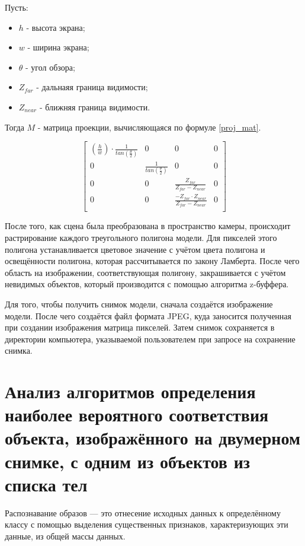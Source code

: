 Пусть:
\begin{itemize}
\item $h$ - высота экрана;
\item $w$ - ширина экрана;
\item $\theta$ - угол обзора;
\item $Z_{far}$ - дальнаяя граница видимости;
\item $Z_{near}$ - ближняя граница видимости.
\end{itemize}

Тогда $M$ - матрица проекции, вычисляющаяся по формуле \ref{proj_mat}.

\begin{equation}\label{proj_mat}
\begin{bmatrix}
(\frac{h}{w})\cdot \frac{1}{tan(\frac{\theta}{2})} & 0 & 0 & 0\\
0 & \frac{1}{tan(\frac{\theta}{2})} & 0 & 0\\
0 & 0 & \frac{Z_{far}}{Z_{far} - Z_{near}} & 0\\
0 & 0 & \frac{-Z_{far} \cdot Z_{near}}{Z_{far} - Z_{near}} & 0\\
\end{bmatrix}
\end{equation}

После того, как сцена была преобразована в пространство камеры, происходит растрирование каждого треугольного полигона модели. Для пикселей этого полигона устанавливается цветовое значение с учётом цвета полигона и освещённости полигона, которая рассчитывается по закону Ламберта. После чего область на изображении, соответствующая полигону, закрашивается с учётом невидимых объектов, который производится с помощью алгоритма z-буффера.

Для того, чтобы получить снимок модели, сначала создаётся изображение модели. После чего создаётся файл формата JPEG, куда заносится полученная при создании изображения матрица пикселей. Затем снимок сохраняется в директории компьютера, указываемой пользователем при запросе на сохранение снимка.

\section{Анализ алгоритмов определения наиболее вероятного соответствия объекта, изображённого на двумерном снимке, с одним из объектов из списка тел}

Распознавание образов — это отнесение исходных данных к определённому классу с помощью выделения существенных признаков, характеризующих эти данные, из общей массы данных. 

